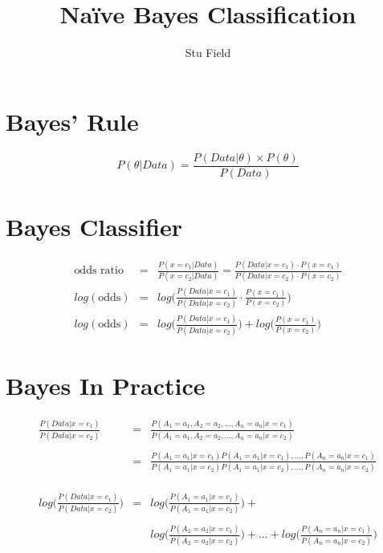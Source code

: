 \documentclass[12pt]{article}
\title{Na\"ive Bayes Classification}
\author{Stu Field}
\date{}   %
\begin{document}
\maketitle


\section{Bayes' Rule}

\begin{equation}
	P(\theta | Data) = \frac{P(Data | \theta) \times P(\theta)}{P(Data)}
\end{equation}


\section{Bayes Classifier}

\begin{eqnarray*}
	\text{odds ratio} &=& \frac{P(x=c_1 | Data)}{P(x=c_2 | Data)} = \frac{P(Data | x=c_1) \cdot P(x=c_1)}{P(Data | x=c_2) \cdot P(x=c_2)} \\
	log(\text{odds}) &=& log\Bigg(\frac{P(Data | x=c_1)}{P(Data | x=c_2)} \cdot \frac{P(x=c_1)}{P(x=c_2)}\Bigg) \\
	log(\text{odds}) &=& log\bigg(\frac{P(Data | x=c_1)}{P(Data | x=c_2)}\bigg) + 
			log\bigg(\frac{P(x=c_1)}{P(x=c_2)}\bigg)
\end{eqnarray*}


\section{Bayes In Practice}

\begin{eqnarray*}
	\frac{P(Data | x=c_1)}{P(Data | x=c_2)} &=& 
		\frac{P(A_1=a_1, A_2=a_2,\dots,A_n=a_n|x=c_1)}
		 {P(A_1=a_1,A_2=a_2,\dots,A_n=a_n|x=c_2)} \\
		 \\
		&=& \frac{P(A_1=a_1|x=c_1) P(A_1=a_1|x=c_1),\dots,P(A_n=a_n|x=c_1)} 
		{P(A_1=a_1|x=c_2) P(A_1=a_1|x=c_2),\dots,P(A_n=a_n|x=c_2)} \\
		\\ \\ \\ 
	log\Bigg(\frac{P(Data | x=c_1)}{P(Data | x=c_2)}\Bigg) &=& 
			log\Bigg(\frac{P(A_1=a_1|x=c_1)}{P(A_1=a_1|x=c_2)}\Bigg) + \\
			\\
			&& log\Bigg(\frac{P(A_2=a_2|x=c_1)}{P(A_2=a_2|x=c_2)}\Bigg) + \dots + 
			log\Bigg(\frac{P(A_n=a_n|x=c_1)}{P(A_n=a_n|x=c_2)}\Bigg)
\end{eqnarray*}
\end{document}
